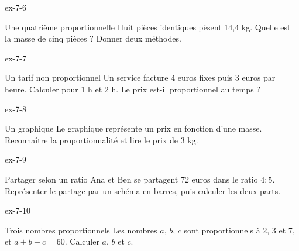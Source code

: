 \begin{blocLivre}{ex-7-6}\begin{exercice}[2]{Une quatrième proportionnelle}
Huit pièces identiques pèsent 14,4 kg. Quelle est la masse de cinq pièces ? Donner deux méthodes.
\end{exercice}\end{blocLivre}
\begin{blocLivre}{ex-7-7}\begin{exercice}[2]{Un tarif non proportionnel}
Un service facture 4 euros fixes puis 3 euros par heure. Calculer pour 1 h et 2 h. Le prix est-il proportionnel au temps ?
\end{exercice}\end{blocLivre}
\begin{blocLivre}{ex-7-8}\begin{exercice}[2]{Un graphique}
Le graphique représente un prix en fonction d’une masse. Reconnaître la proportionnalité et lire le prix de 3 kg.
\label{fig-ex-7-8}
\end{exercice}\end{blocLivre}
\begin{blocLivre}{ex-7-9}\begin{exercice}[2]{Partager selon un ratio}
Ana et Ben se partagent 72 euros dans le ratio $4:5$. Représenter le partage par un schéma en barres, puis calculer les deux parts.
\label{fig-ex-7-9}
\end{exercice}\end{blocLivre}
\begin{blocLivre}{ex-7-10}\begin{exercice}[2]{Trois nombres proportionnels}
Les nombres $a$, $b$, $c$ sont proportionnels à 2, 3 et 7, et $a+b+c=60$. Calculer $a$, $b$ et $c$.
\end{exercice}\end{blocLivre}

